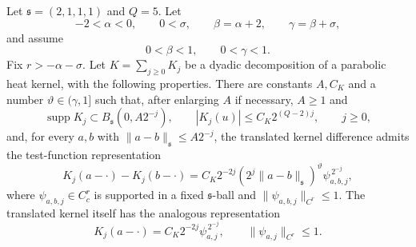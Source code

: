 \begin{proposition}
\label{prop:spde-heat-integration-reexpansion-coefficient-estimate}
Let \(\mathfrak s=(2,1,1,1)\) and \(Q=5\).  Let
\[
  -2<\alpha<0,\qquad
  0<\sigma,\qquad
  \beta=\alpha+2,\qquad
  \gamma=\beta+\sigma ,
\]
and assume
\[
  0<\beta<1,\qquad 0<\gamma<1 .
\]
Fix \(r>-\alpha-\sigma\).  Let \(K=\sum_{j\geq0}K_j\) be a dyadic
decomposition of a parabolic heat kernel, with the following properties.
There are constants \(A,C_K\) and a number \(\vartheta\in(\gamma,1]\) such
that, after enlarging \(A\) if necessary, \(A\geq1\) and
\begin{equation}
  \operatorname{supp}K_j\subset B_{\mathfrak s}(0,A2^{-j}),
  \qquad
  |K_j(u)|\leq C_K2^{(Q-2)j},
  \qquad j\geq0,
  \label{eq:spde-reexpansion-kernel-size}
\end{equation}
and, for every \(a,b\) with
\(\|a-b\|_{\mathfrak s}\leq A2^{-j}\), the translated kernel difference
admits the test-function representation
\begin{equation}
  K_j(a-\cdot)-K_j(b-\cdot)
  =
  C_K2^{-2j}
  (2^j\|a-b\|_{\mathfrak s})^\vartheta
  \psi_{a,b,j}^{\,2^{-j}},
  \label{eq:spde-reexpansion-kernel-difference-test}
\end{equation}
where \(\psi_{a,b,j}\in C_c^r\) is supported in a fixed
\(\mathfrak s\)-ball and \(\|\psi_{a,b,j}\|_{C^r}\leq1\).  The translated
kernel itself has the analogous representation
\begin{equation}
  K_j(a-\cdot)=C_K2^{-2j}\psi_{a,j}^{\,2^{-j}},
  \qquad
  \|\psi_{a,j}\|_{C^r}\leq1 .
  \label{eq:spde-reexpansion-kernel-test}
\end{equation}


\end{proposition}
